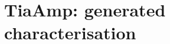 \documentclass[11pt]{article}
\begin{document}
\section*{TiaAmp: generated characterisation}

\end{document}
